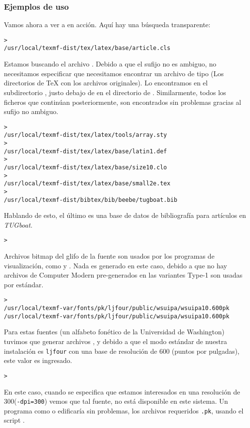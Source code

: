 \documentclass{article}
\begin{document}
\subsubsection{Ejemplos de uso}
\label{sec:examples-of-use}

Vamos ahora a ver a \KPS{} en acción. Aquí hay una búsqueda transparente:

\begin{alltt}
	> 
	/usr/local/texmf-dist/tex/latex/base/article.cls
\end{alltt}
Estamos buscando el archivo . Debido a que el sufijo
 no es ambiguo, no necesitamos especificar que necesitamos
encontrar un archivo de tipo  (Los directorios de \TeX{}
con los archivos originales). Lo encontramos en el subdirectorio
, justo debajo de  en el
directorio de \TL{}. Similarmente, todos los ficheros que continúan
posteriormente, son encontrados sin problemas gracias al sufijo no
ambiguo.
\begin{alltt}
> 
   /usr/local/texmf-dist/tex/latex/tools/array.sty
> 
   /usr/local/texmf-dist/tex/latex/base/latin1.def
>                         
   /usr/local/texmf-dist/tex/latex/base/size10.clo
> 
   /usr/local/texmf-dist/tex/latex/base/small2e.tex
> 
   /usr/local/texmf-dist/bibtex/bib/beebe/tugboat.bib
\end{alltt}

Hablando de esto, el último es una base de datos de bibliografía \BibTeX{} para
artículos en \textsl{TUGboat}.

\begin{alltt}
	> 
\end{alltt}
Archivos bitmap del glifo de la fuente  son usados por los programas de
visualización, como  y . Nada es generado en este caso,
debido a que no hay archivos de Computer Modern pre-generados  en \TL{}\Dash
las variantes Type-1 son usadas por estándar.
\begin{alltt}
	> 
	\ifSingleColumn
	/usr/local/texmf-var/fonts/pk/ljfour/public/wsuipa/wsuipa10.600pk
	\else /usr/local/texmf-var/fonts/pk/ljfour/public/wsuipa/wsuipa10.600pk
\fi\end{alltt}
Para estas fuentes (un alfabeto fonético de la Universidad de Washington) tuvimos que
generar archivos , y debido a que el modo estándar \MF{} de nuestra
instalación es \texttt{ljfour} con una base de resolución de 600\dpi{} (puntos por
pulgadas), este valor es ingresado.
\begin{alltt}
	> 
\end{alltt}
En este caso, cuando se especifica que estamos
interesados en una resolución de
300\dpi (\texttt{-dpi=300}) vemos que tal fuente, no está disponible en este sistema.
Un programa como  o  edificaría sin problemas, los
archivos requeridos \texttt{.pk}, usando el script .
\end{document}
